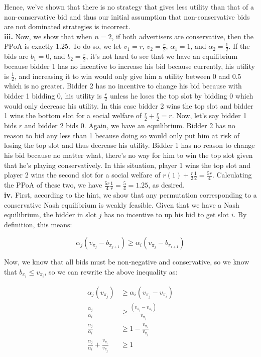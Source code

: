 \documentclass[12 pt]{article}
\begin{document}
	\noindent Hence, we've shown that there is no strategy that gives less utility than that of a non-conservative bid and thus our initial assumption that non-conservative bids are not dominated strategies is incorrect. \\
	
	\noindent \textbf{iii.} Now, we show that when $n = 2$, if both advertisers are conservative, then the PPoA is exactly 1.25. To do so, we let $v_1 = r$, $v_2 = \frac{r}{2}$, $\alpha_1 = 1$, and $\alpha_2 = \frac{1}{2}$. If the bids are $b_1 = 0$, and $b_2 = \frac{r}{2}$, it's not hard to see that we have an equilibrium because bidder 1 has no incentive to increase his bid because currently, his utility is $\frac{1}{2}$, and increasing it to win would only give him a utility between 0 and 0.5 which is no greater. Bidder 2 has no incentive to change his bid because with bidder 1 bidding 0, his utility is $\frac{r}{2}$ unless he loses the top slot by bidding 0 which would only decrease his utility. In this case bidder 2 wins the top slot and bidder 1 wins the bottom slot for a social welfare of $\frac{r}{2} + \frac{r}{2} = r$. Now, let's say bidder 1 bids $r$ and bidder 2 bids 0. Again, we have an equilibrium. Bidder 2 has no reason to bid any less than 1 because doing so would only put him at risk of losing the top slot and thus decrease his utility. Bidder 1 has no reason to change his bid because no matter what, there's no way for him to win the top slot given that he's playing conservatively. In this situation, player 1 wins the top slot and player 2 wins the second slot for a social welfare of $r(1) + \frac{r}{2}\frac{1}{2} = \frac{5r}{4}$. Calculating the PPoA of these two, we have $\frac{5r}{4} \frac{1}{r} = \frac{5}{4} = 1.25$, as desired. \\
	
	\noindent \textbf{iv.} First, according to the hint, we show that any permutation corresponding to a conservative Nash equilibrium is weakly feasible. Given that we have a Nash equilibrium, the bidder in slot $j$ has no incentive to up his bid to get slot $i$. By definition, this means:
	
	\[
	\alpha_j (v_{\pi_j} - b_{\pi_{j+1}}) \geq \alpha_i (v_{\pi_j} - b_{\pi_{i+1}}) 
	\]
	
	\noindent Now, we know that all bids must be non-negative and conservative, so we know that $b_{\pi_i} \leq v_{\pi_i}$, so we can rewrite the above inequality as:

	\[
	\begin{split}	
	\alpha_j (v_{\pi_j}) &\geq \alpha_i (v_{\pi_j} - v_{\pi_i}) \\
	\frac{\alpha_j}{\alpha_i} &\geq \frac{(v_{\pi_j} - v_{\pi_i})}{v_{\pi_j}}\\
	\frac{\alpha_j}{\alpha_i} &\geq 1 - \frac{v_{\pi_i}}{v_{\pi_j}}\\
	\frac{\alpha_j}{\alpha_i} + \frac{v_{\pi_i}}{v_{\pi_j}} &\geq 1	\\
	\end{split}
	\]
	
\end{document}
